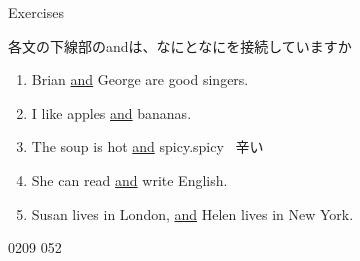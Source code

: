\documentclass[aspectratio=169,xcolor={dvipsnames,table}]{beamer}
\begin{document}
\begin{frame}[plain]{Exercises}

 {\small 各文の下線部のandは、なにとなにを接続していますか}
\begin{enumerate}
 \item Brian \underline{and} George are good singers.
 \item I like apples \underline{and} bananas.
 \item The soup is hot \underline{and} spicy.\hfill{spicy {\small {}\, 辛い}}
 \item She can read \underline{and} write English.\\
\hfill{}
 \item Susan lives in London, \underline{and} Helen lives in New York.\\
\hfill{}
\end{enumerate}

\hfill{\tiny 0209}\,{\tiny{}\,052}

\end{frame}

\end{document}
